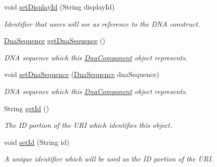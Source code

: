\begin{DoxyCompactItemize}
void \hyperlink{classorg_1_1sbolstandard_1_1lib_s_b_o_lj_1_1_dna_component_a23e4982b43cd5a2b868c21a78ce0a9ee}{setDisplayId} (String displayId)
\begin{DoxyCompactList}\small\item\em Identifier that users will see as reference to the DNA construct. \item\end{DoxyCompactList}\item 
\hyperlink{classorg_1_1sbolstandard_1_1lib_s_b_o_lj_1_1_dna_sequence}{DnaSequence} \hyperlink{classorg_1_1sbolstandard_1_1lib_s_b_o_lj_1_1_dna_component_aaee003e62666244972b2a0c872a85663}{getDnaSequence} ()
\begin{DoxyCompactList}\small\item\em DNA sequence which this \hyperlink{classorg_1_1sbolstandard_1_1lib_s_b_o_lj_1_1_dna_component}{DnaComponent} object represents. \item\end{DoxyCompactList}\item 
void \hyperlink{classorg_1_1sbolstandard_1_1lib_s_b_o_lj_1_1_dna_component_a33338268a8d859ea2fd892cabdc3b033}{setDnaSequence} (\hyperlink{classorg_1_1sbolstandard_1_1lib_s_b_o_lj_1_1_dna_sequence}{DnaSequence} dnaSequence)
\begin{DoxyCompactList}\small\item\em DNA sequence which this \hyperlink{classorg_1_1sbolstandard_1_1lib_s_b_o_lj_1_1_dna_component}{DnaComponent} object represents. \item\end{DoxyCompactList}\item 
String \hyperlink{classorg_1_1sbolstandard_1_1lib_s_b_o_lj_1_1_dna_component_aa851daaf10426c9a42044ca1a7fe8060}{getId} ()
\begin{DoxyCompactList}\small\item\em The ID portion of the URI which identifies this object. \item\end{DoxyCompactList}\item 
void \hyperlink{classorg_1_1sbolstandard_1_1lib_s_b_o_lj_1_1_dna_component_aea61027e5c308a8200c07d76d0f597b1}{setId} (String id)
\begin{DoxyCompactList}\small\item\em A unique identifier which will be used as the ID portion of the URI. \item\end{DoxyCompactList}\item 

\end{DoxyCompactItemize}
